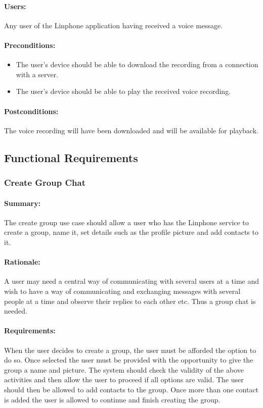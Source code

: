 \documentclass[11pt]{article}
\begin{document}
\paragraph{Users:} Any user of the Linphone application having received a voice message.
\paragraph{Preconditions:} 
\begin{itemize}
\item The user's device should be able to download the recording from a connection with a server.
\item The user's device should be able to play the received voice recording.
\end{itemize}
\paragraph{{Postconditions:}} The voice recording will have been downloaded and will be available for playback.

\subsection{Functional Requirements}
\subsubsection{Create Group Chat} \label{FR-create-group}
\paragraph{Summary:} The create group use case should allow a user who has the Linphone service to create a group, name it, set details such as the profile picture and add contacts to it.
\paragraph{Rationale:} A user may need a central way of communicating with several users at a time and wish to have a way of communicating and exchanging messages with several people at a time and observe their replies to each other etc. Thus a group chat is needed.
\paragraph{Requirements:} When the user decides to create a group, the user must be afforded the option to do so. Once selected the user must be provided with the opportunity to give the group a name and picture. The system should check the validity of the above activities and then allow the user to proceed if all options are valid. The user should then be allowed to add contacts to the group. Once more than one contact is added the user is allowed to continue and finish creating the group.
\end{document}
